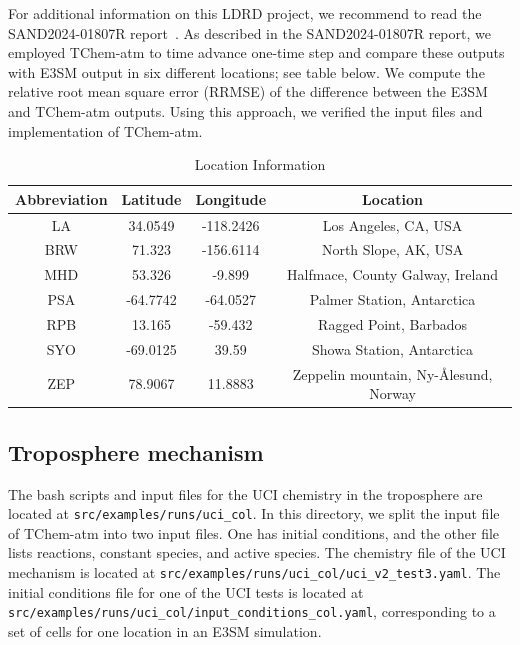\documentclass[report, 12pt]{SANDreport}
\begin{document}
For additional information on this LDRD project, we recommend to read the SAND2024-01807R report~\cite{Diaz-Ibarra:2024:tchem}. As described in the SAND2024-01807R report, we employed TChem-atm to time advance one-time step and compare these outputs with E3SM output in six different locations; see table below. We compute the relative root mean square error (RRMSE) of the difference between the E3SM and TChem-atm outputs. Using this approach, we verified the input files and implementation of TChem-atm.


\begin{table}[htbp]
    \centering
    \begin{tabular}{|c|c|c|c|}
        \hline
        Abbreviation & Latitude & Longitude & Location \\
        \hline
        LA & 34.0549 & -118.2426 & Los Angeles, CA, USA \\
        BRW & 71.323 & -156.6114 & North Slope, AK, USA \\
        MHD & 53.326 & -9.899 & Halfmace, County Galway, Ireland \\
        PSA & -64.7742 & -64.0527 & Palmer Station, Antarctica \\
        RPB & 13.165 & -59.432 & Ragged Point, Barbados \\
        SYO & -69.0125 & 39.59 & Showa Station, Antarctica \\
        ZEP & 78.9067 & 11.8883 & Zeppelin mountain, Ny-\AA lesund, Norway \\
        \hline
    \end{tabular}
    \caption{Location Information}
    \label{tab:location-info}
\end{table}


\subsection{Troposphere mechanism}

The bash scripts and input files for the UCI chemistry in the troposphere are located at \verb|src/examples/runs/uci_col|. In this directory, we split the input file of TChem-atm into two input files. One has initial conditions, and the other file lists reactions, constant species, and active species. The chemistry file of the UCI mechanism is located at \verb|src/examples/runs/uci_col/uci_v2_test3.yaml|. The initial conditions file for one of the UCI tests is located at \verb|src/examples/runs/uci_col/input_conditions_col.yaml|, corresponding to a set of cells for one location in an E3SM simulation.
\end{document}
